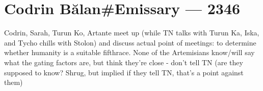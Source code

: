 \hypertarget{codrin-bux103lanemissary-2346}{%
\chapter{Codrin Bălan\#Emissary — 2346}\label{codrin-bux103lanemissary-2346}}

Codrin, Sarah, Turun Ko, Artante meet up (while TN talks with Turun Ka, Iska, and Tycho chills with Stolon) and discuss actual point of meetings: to determine whether humanity is a suitable fifthrace. None of the Artemisians know/will say what the gating factors are, but think they're close - don't tell TN (are they supposed to know? Shrug, but implied if they tell TN, that's a point against them)
